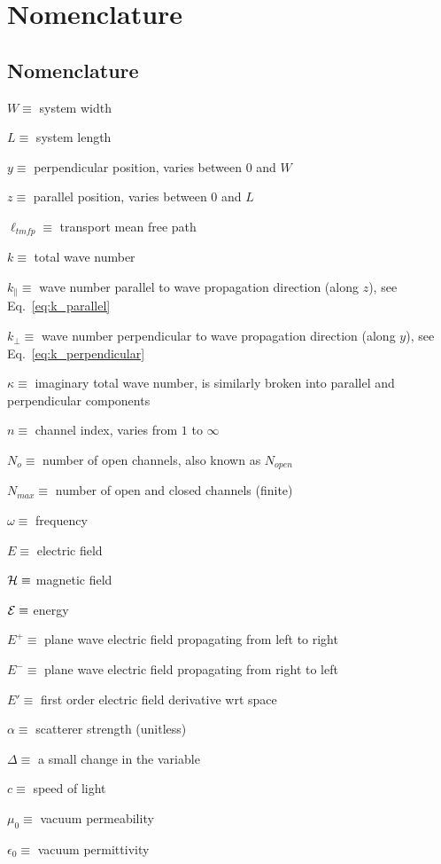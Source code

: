 \section{Nomenclature}


\subsection{Nomenclature}

$W \equiv$ system width

$L \equiv$ system length

$y \equiv$ perpendicular position, varies between $0$ and $W$

$z \equiv$ parallel position, varies between $0$ and $L$

$\ell_{tmfp} \equiv$ transport mean free path

$k \equiv$ total wave number

$k_{\parallel} \equiv$ wave number parallel to wave propagation direction (along $z$), see Eq.~\ref{eq:k_parallel}

$k_{\bot} \equiv$ wave number perpendicular to wave propagation direction (along $y$), see Eq.~\ref{eq:k_perpendicular}

$\kappa \equiv$ imaginary total wave number, is similarly broken into parallel and perpendicular components

$n \equiv$ channel index, varies from $1$ to $\infty$

$N_o \equiv$ number of open channels, also known as $N_{open}$

$N_{max} \equiv$ number of open and closed channels (finite)

$\omega \equiv$ frequency

$E \equiv$ electric field

${\cal H} \equiv$ magnetic field

${\cal E} \equiv$ energy

$E^+ \equiv$ plane wave electric field propagating from left to right

$E^- \equiv$ plane wave electric field propagating from right to left

$E' \equiv$ first order electric field derivative wrt space

$\alpha \equiv$ scatterer strength (unitless)

$\Delta \equiv$ a small change in the variable

$c \equiv$ speed of light

$\mu_0 \equiv$ vacuum permeability

$\epsilon_0 \equiv$ vacuum permittivity

